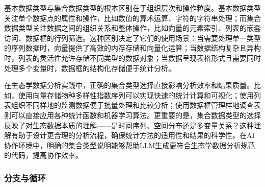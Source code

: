 \documentclass[
  twoside]{book}
\begin{document}
基本数据类型与集合数据类型的根本区别在于组织层次和操作粒度。基本数据类型关注单个数据点的属性和操作，比如数值的算术运算、字符的字符串处理；而集合数据类型关注数据之间的组织关系和整体操作，比如向量的元素索引、列表的嵌套访问、数据框的行列筛选。这种区别决定了它们的使用场景：当需要处理单一类型的序列数据时，向量提供了高效的内存存储和向量化运算；当数据结构复杂且异构时，列表的灵活性允许存储不同类型的数据对象；当数据呈现表格形式且需要同时处理多个变量时，数据框的结构化存储便于统计分析。

在生态学数据分析实践中，正确的集合类型选择直接影响分析效率和结果质量。比如，使用向量存储物种多样性指数序列可以实现快速的统计计算和可视化；使用列表组织不同样地的监测数据便于批量处理和比较分析；使用数据框管理样地调查表则可以直接应用各种统计函数和机器学习算法。更重要的是，集合数据类型的选择反映了对生态数据本质的理解------是时间序列、空间分布还是多变量关系？这种理解有助于设计更合理的分析流程，确保统计方法的适用性和结果的科学性。在AI协作环境中，明确的集合类型说明能够帮助LLM生成更符合生态学数据分析规范的代码，提高协作效率。

\hypertarget{ux5206ux652fux4e0eux5faaux73af}{%
\subsubsection{分支与循环}\label{ux5206ux652fux4e0eux5faaux73af}}
\end{document}

